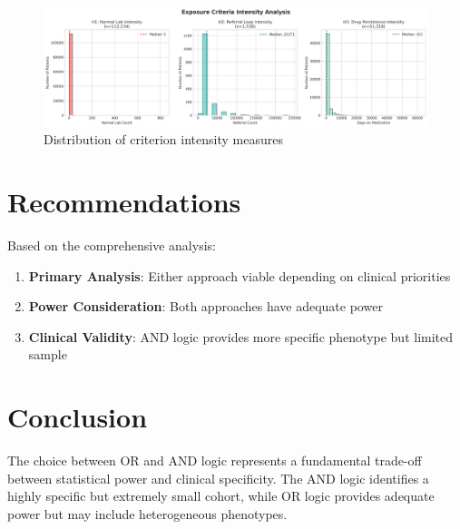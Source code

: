 \documentclass[11pt]{article}
\begin{document}
\begin{figure}[H]
\centering
\includegraphics[width=\textwidth]{criteria_intensity.png}
\caption{Distribution of criterion intensity measures}
\end{figure}

\section{Recommendations}

Based on the comprehensive analysis:

\begin{enumerate}
\item \textbf{Primary Analysis}: Either approach viable depending on clinical priorities
\item \textbf{Power Consideration}: Both approaches have adequate power
\item \textbf{Clinical Validity}: AND logic provides more specific phenotype but limited sample
\end{enumerate}

\section{Conclusion}

The choice between OR and AND logic represents a fundamental trade-off between statistical power and clinical specificity. The AND logic identifies a highly specific but extremely small cohort, while OR logic provides adequate power but may include heterogeneous phenotypes.
\end{document}

